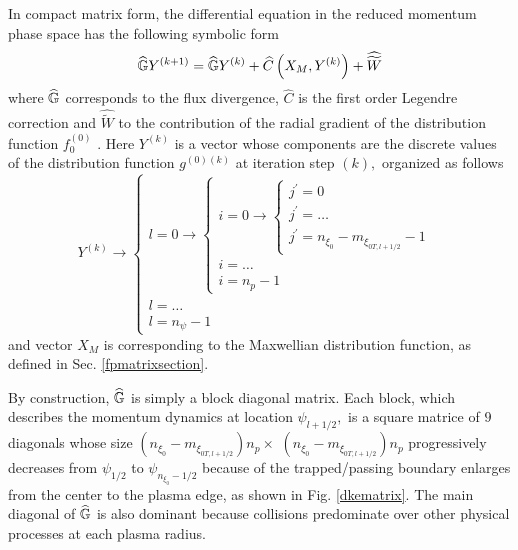 In compact matrix form, the differential equation in the reduced momentum
phase space has the following symbolic form
\begin{equation}
\widehat{\Bbb{G}}Y^{(k+1)}=\widehat{\Bbb{G}}Y^{(k)}+\widehat{C}\left(
X_{M},Y^{(k)}\right) +\widehat{\widetilde{W}}  \label{Matrixeqg}
\end{equation}
where $\widehat{\Bbb{G}}$ corresponds to the flux divergence, $\widehat{C}$
is the first order Legendre correction and $\widehat{\widetilde{W}}$ to the
contribution of the radial gradient of the distribution function $%
f_{0}^{\left( 0\right) }$ . Here $Y^{(k)}$ is a vector whose components are
the discrete values of the distribution function $g^{\left( 0\right) \left(
k\right) }$ at iteration step $\left( k\right) ,$ organized as follows
\begin{equation}
Y^{(k)}\rightarrow \left\{
\begin{array}{l}
l=0\rightarrow \left\{
\begin{array}{l}
i=0\rightarrow \left\{
\begin{array}{l}
j^{\prime }=0 \\
j^{\prime }=\ldots \\
j^{\prime }=n_{\xi _{0}}-m_{\xi _{0T,l+1/2}}-1
\end{array}
\right. \\
i=\ldots \\
i=n_{p}-1
\end{array}
\right. \\
l=\ldots \\
l=n_{\psi }-1
\end{array}
\right.
\end{equation}
and vector $X_{M}$ is corresponding to the Maxwellian distribution function,
as defined in Sec. \ref{fpmatrixsection}.

By construction, $\widehat{\Bbb{G}}$ is simply a block diagonal matrix. Each
block, which describes the momentum dynamics at location $\psi _{l+1/2},$ is
a square matrice of $9$ diagonals whose size $\left( n_{\xi _{0}}-m_{\xi
_{0T,l+1/2}}\right) n_{p}\times $ $\left( n_{\xi _{0}}-m_{\xi
_{0T,l+1/2}}\right) n_{p}$ progressively decreases from $\psi _{1/2}$ to $%
\psi _{n_{\xi _{0}}-1/2}$ because of the trapped/passing boundary enlarges
from the center to the plasma edge, as shown in Fig. \ref{dkematrix}$.$ The
main diagonal of $\widehat{\Bbb{G}}$ is also dominant because collisions
predominate over other physical processes at each plasma radius.

%

